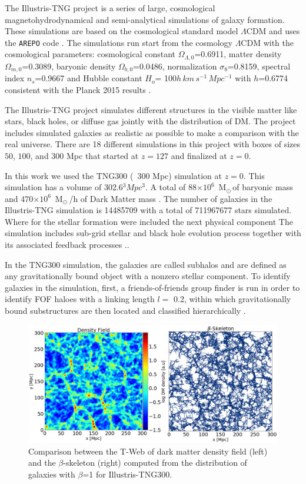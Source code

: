 \documentclass[usenatbib]{mnras}
\newcommand{\Msun}{\,{\rm M}$_{\odot}$\,}
\begin{document}
The
Illustris-TNG project \citep{Nelson2015} is a series of large,
cosmological magnetohydrodynamical and semi-analytical simulations of galaxy formation. 
These simulations are based on the cosmological standard model
$\Lambda$CDM and uses the \texttt{AREPO} code \citep{Springel2011}.
The simulations run start from the cosmology $\Lambda$CDM with the
cosmological parameters: cosmological constant
$\Omega_{\Lambda,0}$=0.6911, matter density $\Omega_{m,0}$=0.3089,
baryonic density $\Omega_{b,0}$=0.0486, normalization
$\sigma_8$=0.8159, spectral index $n_s$=0.9667 and Hubble constant
$H_o$= 100$h\,km\,s^{-1}\,Mpc^{-1}$ with $h$=0.6774 consistent with
the Planck 2015 results \citep{Ade2016}.  

The Illustris-TNG project simulates different structures in the visible matter like stars, black holes, or diffuse gas jointly with the distribution of DM.
The project includes simulated galaxies as realistic as possible to
make a comparison with the real universe. There are 18 different
simulations in this project with boxes of sizes $50$, $100$, and $300$
Mpc that started at $z=127$ and finalized at $z=0$.    

In this work we used the TNG300 (~300 Mpc) simulation at $z=0$.
This simulation has a volume of 302.6$^3 Mpc^3$.  
A total of 88$\times 10^{6}$ \Msun of baryonic mass and 470$\times
10^{6}$ \Msun/h of Dark Matter mass \citep{Nelson2015}.  
The number of galaxies in the Illustris-TNG simulation is 14485709 
with a total of 711967677 stars simulated. 
Where for the stellar formation were included the next physical
component 
The simulation includes sub-grid stellar and black hole evolution
process together with its associated 
feedback processes \citep{Nelson2015,Pillepich2018a}..


In the TNG300 simulation, the galaxies are called subhalos and
are defined as any gravitationally
bound object with a nonzero
stellar component.
To identify galaxies in the simulation,
first, a friends-of-friends group finder is run
in order to identify FOF haloes with
a linking length $l=$ 0.2,
within which gravitationally bound substructures
are then located and classified hierarchically \cite{Pillepich2018a}.
 
\begin{figure}
\centering
 \includegraphics[scale=0.3]{Figs/p_Fig1_.png}%
 \caption{Comparison between the T-Web of dark matter density field
   (left) and the $\beta$-skeleton (right) computed from the
   distribution of galaxies with $\beta$=1 for Illustris-TNG300.}  
 \label{fig:TWebBsk}
\end{figure}
\end{document}
